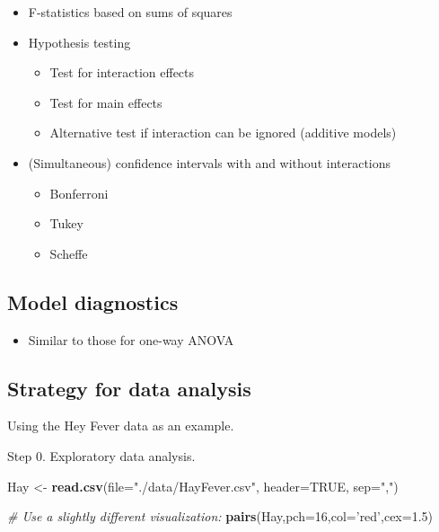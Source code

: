\documentclass[12pt,]{book}
\newenvironment{Shaded}{\begin{snugshade}}{\end{snugshade}}
\newcommand{\KeywordTok}[1]{\textcolor[rgb]{0.13,0.29,0.53}{\textbf{#1}}}
\newcommand{\DataTypeTok}[1]{\textcolor[rgb]{0.13,0.29,0.53}{#1}}
\newcommand{\DecValTok}[1]{\textcolor[rgb]{0.00,0.00,0.81}{#1}}
\newcommand{\FloatTok}[1]{\textcolor[rgb]{0.00,0.00,0.81}{#1}}
\newcommand{\StringTok}[1]{\textcolor[rgb]{0.31,0.60,0.02}{#1}}
\newcommand{\CommentTok}[1]{\textcolor[rgb]{0.56,0.35,0.01}{\textit{#1}}}
\newcommand{\OtherTok}[1]{\textcolor[rgb]{0.56,0.35,0.01}{#1}}
\newcommand{\NormalTok}[1]{#1}
\providecommand{\tightlist}{%
  \setlength{\itemsep}{0pt}\setlength{\parskip}{0pt}}
\begin{document}
\begin{itemize}
\tightlist
\item
  F-statistics based on sums of squares
\item
  Hypothesis testing

  \begin{itemize}
  \tightlist
  \item
    Test for interaction effects
  \item
    Test for main effects
  \item
    Alternative test if interaction can be ignored (additive models)
  \end{itemize}
\item
  (Simultaneous) confidence intervals with and without interactions

  \begin{itemize}
  \tightlist
  \item
    Bonferroni
  \item
    Tukey
  \item
    Scheffe
  \end{itemize}
\end{itemize}

\subsection{Model diagnostics}\label{model-diagnostics-1}

\begin{itemize}
\tightlist
\item
  Similar to those for one-way ANOVA
\end{itemize}

\subsection{Strategy for data
analysis}\label{strategy-for-data-analysis}

Using the Hey Fever data as an example.

Step 0. Exploratory data analysis.

\begin{Shaded}
\begin{Highlighting}[]
\NormalTok{Hay <-}\StringTok{ }\KeywordTok{read.csv}\NormalTok{(}\DataTypeTok{file=}\StringTok{"./data/HayFever.csv"}\NormalTok{, }\DataTypeTok{header=}\OtherTok{TRUE}\NormalTok{, }\DataTypeTok{sep=}\StringTok{","}\NormalTok{)}

\CommentTok{# Use a slightly different visualization:}
\KeywordTok{pairs}\NormalTok{(Hay,}\DataTypeTok{pch=}\DecValTok{16}\NormalTok{,}\DataTypeTok{col=}\StringTok{'red'}\NormalTok{,}\DataTypeTok{cex=}\FloatTok{1.5}\NormalTok{)}
\end{Highlighting}
\end{Shaded}
\end{document}
